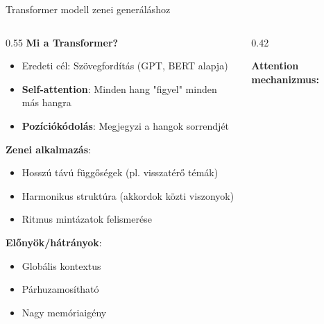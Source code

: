 \documentclass[aspectratio=169]{beamer}
\begin{document}
\begin{frame}{Transformer modell zenei generáláshoz}
\begin{columns}[T]
\begin{column}{0.55\textwidth}
\textbf{Mi a Transformer?}
\begin{itemize}
    \item Eredeti cél: Szövegfordítás (GPT, BERT alapja)
    \item \textbf{Self-attention}: Minden hang "figyel" minden más hangra
    \item \textbf{Pozíciókódolás}: Megjegyzi a hangok sorrendjét
\end{itemize}

\vspace{0.5em}
\textbf{Zenei alkalmazás}:
\begin{itemize}
    \item Hosszú távú függőségek (pl. visszatérő témák)
    \item Harmonikus struktúra (akkordok közti viszonyok)
    \item Ritmus mintázatok felismerése
\end{itemize}

\vspace{0.5em}
\textbf{Előnyök/hátrányok}:
\begin{itemize}
    \item[\textcolor{green}{+}] Globális kontextus
    \item[\textcolor{green}{+}] Párhuzamosítható
    \item[\textcolor{red}{-}] Nagy memóriaigény
\end{itemize}
\end{column}

\begin{column}{0.42\textwidth}
\vspace{0.5em}
\begin{center}
\textbf{Attention mechanizmus:}
\vspace{0.3em}

\end{center}
\end{column}
\end{columns}
\end{frame}
\end{document}
